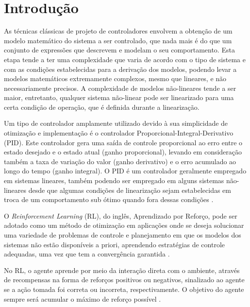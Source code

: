 \documentclass[a4paper]{ifacconf}
\begin{document}


\section{Introdução}


As técnicas clássicas de projeto de controladores envolvem a obtenção de um modelo matemático do sistema a ser controlado, que nada mais é do que um conjunto de expressões que descrevem e modelam o seu comportamento. Esta etapa tende a ter uma complexidade que varia de acordo com o tipo de sistema e com as condições estabelecidas para a derivação dos modelos, podendo levar a modelos matemáticos extremamente complexos, mesmo que lineares, e não necessariamente precisos. A complexidade de modelos não-lineares tende a ser maior, entretanto, qualquer sistema não-linear pode ser linearizado para uma certa condição de operação, que é definida durante a linearização.

Um tipo de controlador amplamente utilizado devido à sua simplicidade de otimização e implementação é o controlador Proporcional-Integral-Derivativo (PID). Este controlador gera uma saída de controle proporcional ao erro entre o estado desejado e o estado atual (ganho proporcional), levando em consideração também a taxa de variação do valor (ganho derivativo) e o erro acumulado ao longo do tempo (ganho integral). O PID é um controlador geralmente empregado em sistemas lineares, também podendo ser empregado em alguns sistemas não-lineares \cite{nonLinearPID}  desde que algumas condições de linearização sejam estabelecidas em troca de um comportamento sub ótimo quando fora dessas condições \cite{pid_autotune_relay, pid_engine_tuning,embarcados_pid_1}.

O \emph{Reinforcement Learning} (RL), do inglês, Aprendizado por Reforço, pode ser adotado como um método de otimização em aplicações onde se deseja solucionar uma variedade de problemas de controle e planejamento em que os modelos dos sistemas não estão disponíveis a priori, aprendendo estratégias de controle adequadas, uma vez que tem a convergência garantida \cite{ql_pid_robotics,intro_to_rl,rl_rob_survey,ql_pid_robotics}.

No RL, o agente aprende por meio da interação direta com o ambiente, através de recompensas na forma de reforços positivos ou negativos, sinalizado ao agente se a ação tomada foi correta ou incorreta, respectivamente. O objetivo do agente sempre será acumular o máximo de reforço possível \cite{ql_pid_robotics,intro_to_rl,rl_rob_survey,ql_pid_robotics}.
\end{document}
